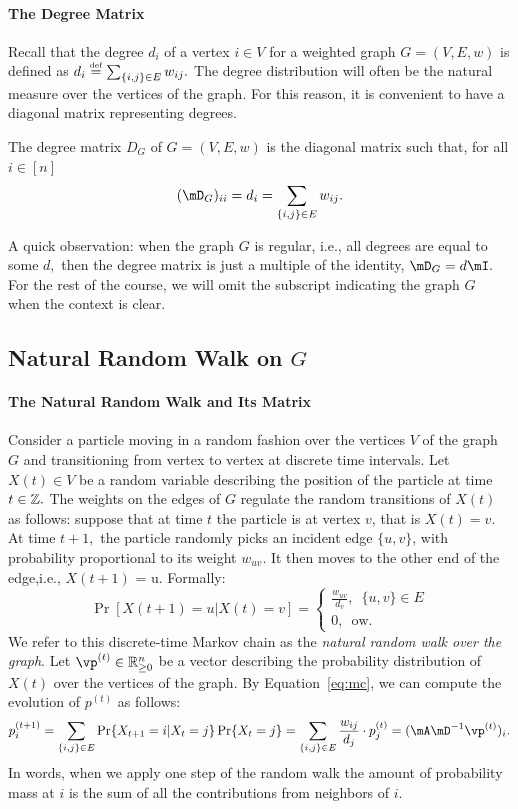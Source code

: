 \paragraph{The Degree Matrix}

Recall that the degree $d_i$ of a vertex $i \in V$ for a weighted graph $G=(V,E, w)$ is defined as $d_i \stackrel{\mathrm{\scriptscriptstyle def}}{=} \sum_{\{i,j\} \in E} w_{ij}.$ The degree distribution will often be the natural measure over the vertices of the graph. For this reason, it is convenient to have a diagonal matrix representing degrees.
\begin{definition}
The degree matrix ${D}_G$ of $G=(V,E, w)$ is  the diagonal matrix such that, for all $i \in [n]$
$$
({\mD}_G)_{ii} = d_i = \sum_{\{i,j\} \in E} w_{ij}.
$$ 
\end{definition}
A quick observation: when the graph $G$ is regular, i.e., all degrees are equal to some $d,$ then the degree matrix is just a multiple of the identity, $\mD_G = d \mI.$ For the rest of the course, we will omit the subscript indicating the graph $G$ when the context is clear.

\subsection{Natural Random Walk on $G$} \label{sec:random-walk}

\paragraph{The Natural Random Walk and Its Matrix}
Consider a particle moving in a random fashion over the vertices $V$ of the graph $G$ and transitioning from vertex to vertex at discrete time intervals. Let $X(t) \in V$ be a random variable describing the position of the particle at time $t \in \mathbb{Z}.$ The weights on the edges of $G$ regulate the random transitions of $X(t)$ as follows: suppose that at time $t$ the particle is at vertex $v$, that is $X(t) = v$. At time $t+1,$ the particle randomly picks an incident edge $\{u,v\}$, with probability proportional to its weight $w_{uv}.$ It then moves to the other end of the edge,i.e., $X(t+1)$ = u. Formally:
\begin{equation} \label{eq:mc}
\Pr[X(t+1) = u | X(t) = v] = \begin{cases}
    \frac{w_{uv}}{d_v}, \enspace \{u,v\} \in E\\
    0, \enspace \textrm{ow}.
\end{cases}
\end{equation}
We refer to this discrete-time Markov chain as the {\it natural random walk over the graph}. 
%
Let  $\vp^{(t)} \in \mathbb{R}^n_{\geq 0}$ be a vector describing the probability distribution of $X(t)$ over the vertices of the graph. By Equation~\ref{eq:mc}, we can compute the evolution of $p^{(t)}$ as follows:
\begin{equation}
p^{(t+1)}_i = \sum_{\{i,j\} \in E} \Pr\{X_{t+1} = i | X_{t} = j \} \Pr\{X_{t} = j\} = \sum_{\{i,j\} \in E}
\frac{w_{ij}}{d_j} \cdot p^{(t)}_j = ({\mA} \mD^{-1} \vp^{(t)})_i.
\end{equation}
In words,  when we apply one step of the random walk the amount of probability mass at $i$  is the sum of all the contributions from neighbors of $i.$ 


